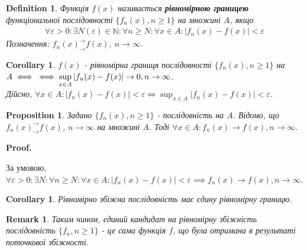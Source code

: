 \documentclass[a4paper, 10pt]{article}
\makeatletter
\def\huge{\displaystyle}
\def\qed{$\blacksquare$}
\theoremstyle{theoremdd}
\theoremstyle{theoremdd}
\newtheorem{definition}[theorem]{Definition}
\theoremstyle{theoremdd}
\theoremstyle{theoremdd}
\theoremstyle{theoremdd}
\newtheorem{proposition}[theorem]{Proposition}
\theoremstyle{theoremdd}
\newtheorem{remark}[theorem]{Remark}
\theoremstyle{theoremdd}
\theoremstyle{theoremdd}
\newtheorem{corollary}[theorem]{Corollary}
\renewenvironment{proof}[1][Proof.\\]{\par
\pushQED{\hfill \qed}%
\normalfont \topsep6\p@\@plus6\p@\relax
\trivlist
\item\relax
{\bfseries
#1\@addpunct{.}}\hspace\labelsep\ignorespaces
}{%
\popQED\endtrivlist\@endpefalse
}
\makeatother
\begin{document}
\begin{definition}
Функція $f(x)$ називається \textbf{рівномірною границею} функціональної послідовності $\{f_n(x), n \geq 1 \}$ на множині $A$, якщо
\begin{align*}
\forall \varepsilon > 0: \exists N(\varepsilon) \in \mathbb{N}: \forall n \geq N: \forall x \in A: |f_n(x)-f(x)| < \varepsilon
\end{align*}
Позначення: $f_n(x)^\rightarrow_\rightarrow f(x)$, $n \to \infty$.
\end{definition}

\begin{corollary}
$f(x)$ - рівномірна границя послідовності $\{f_n(x), n \geq 1\}$ на $A \iff \\ \iff \huge\sup_{x \in A} |f_n(x) - f(x)| \to 0, n \to \infty$.\\
\textit{Дійсно, $\forall x \in A: |f_n(x)-f(x)| < \varepsilon \iff \huge\sup_{x \in A} |f_n(x) - f(x)| < \varepsilon$}.
\end{corollary}

\begin{proposition}
Задано $\{f_n(x), n \geq 1\}$ - послідовність на $A$. Відомо, що $f_n(x)^\rightarrow_\rightarrow f(x)$, $n \to \infty$ на множині $A$. Тоді $\forall x \in A: f_n(x) \to f(x), n \to \infty$.
\end{proposition}

\begin{proof}
За умовою, $\forall \varepsilon > 0: \exists N: \forall n \geq N: \forall x \in A: |f_n(x) - f(x)| < \varepsilon \implies f_n(x) \to f(x), n \to \infty$.
\end{proof}

\begin{corollary}
Рівномірно збіжна послідовність має єдину рівномірну границю.
\end{corollary}

\begin{remark}
Таким чином, єдиний кандидат на рівномірну збіжність послідовність $\{f_n, n \geq 1\}$ - це сама функція $f$, що була отримана в результаті поточкової збіжності.
\end{remark}
\end{document}
